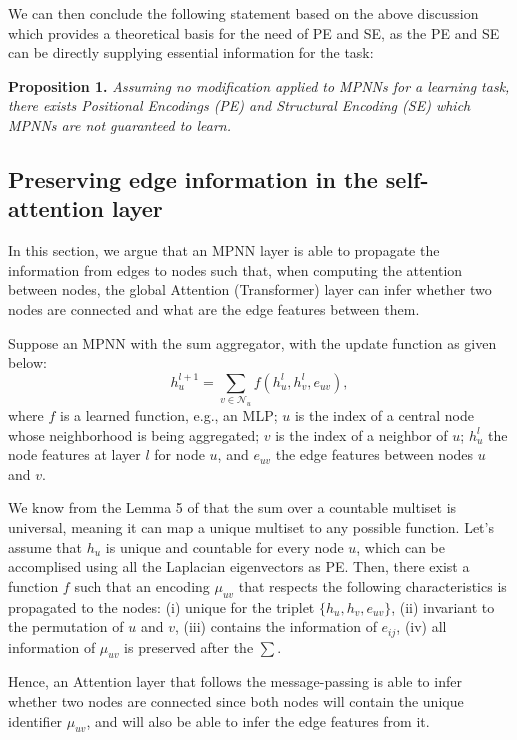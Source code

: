 \documentclass{article}
\begin{document}

We can then conclude the following statement based on the above discussion which provides a theoretical basis for the need of PE and SE, as the PE and SE can be directly supplying essential information for the task:

\textbf{Proposition 1.} \textit{Assuming no modification applied to MPNNs for a learning task, there exists Positional Encodings (PE) and Structural Encoding (SE) which MPNNs are not guaranteed to learn.}

\newpage
\subsection{Preserving edge information in the self-attention layer}
\label{app:edge-in-attention}

In this section, we argue that an MPNN layer is able to propagate the information from edges to nodes such that, when computing the attention between nodes, the global Attention (Transformer) layer can infer whether two nodes are connected and what are the edge features between them.

Suppose an MPNN with the sum aggregator, with the update function as given below:
\begin{equation}
    h_u^{l+1} = \sum_{v\in\mathcal{N}_u}{f(h_u^l, h_v^l, e_{uv})},
\end{equation}
where $f$ is a learned function, e.g., an MLP; $u$ is the index of a central node whose neighborhood is being aggregated; $v$ is the index of a neighbor of $u$; $h^l_u$ the node features at layer $l$ for node $u$, and $e_{uv}$ the edge features between nodes $u$ and $v$.

We know from the Lemma 5 of \citet{xu2018how} that the sum over a countable multiset is universal, meaning it can map a unique multiset to any possible function. Let's assume that $h_u$ is unique and countable for every node $u$, which can be accomplised using all the Laplacian eigenvectors as PE. Then, there exist a function $f$ such that an encoding $\mu_{uv}$ that respects the following characteristics is propagated to the nodes: (i) unique for the triplet $\{h_u, h_v, e_{uv}\}$, (ii) invariant to the permutation of $u$ and $v$, (iii) contains the information of $e_{ij}$, (iv) all information of $\mu_{uv}$ is preserved after the $\sum$.

Hence, an Attention layer that follows the message-passing is able to infer whether two nodes are connected since both nodes will contain the unique identifier $\mu_{uv}$, and will also be able to infer the edge features from it.
\end{document}
